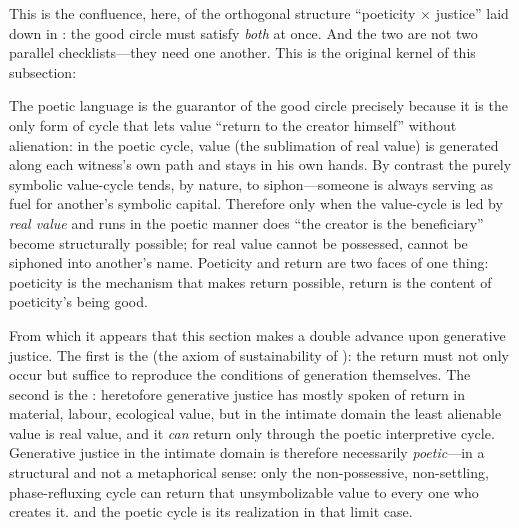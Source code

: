 This is the confluence, here, of the orthogonal structure ``poeticity $\times$ justice'' laid down in : the good circle must satisfy \emph{both} at once. And the two are not two parallel checklists---they need one another. This is the original kernel of this subsection:

\begin{claim}
The poetic language is the guarantor of the good circle precisely because it is the only form of cycle that lets value ``return to the creator himself'' without alienation: in the poetic cycle, value (the sublimation of real value) is generated along each witness's own path and stays in his own hands. By contrast the purely symbolic value-cycle tends, by nature, to siphon---someone is always serving as fuel for another's symbolic capital. Therefore only when the value-cycle is led by \emph{real value} and runs in the poetic manner does ``the creator is the beneficiary'' become structurally possible; for real value cannot be possessed, cannot be siphoned into another's name. Poeticity and return are two faces of one thing: poeticity is the mechanism that makes return possible, return is the content of poeticity's being good.
\end{claim}

From which it appears that this section makes a double advance upon generative justice. The first is the  (the axiom of sustainability of ): the return must not only occur but suffice to reproduce the conditions of generation themselves. The second is the : heretofore generative justice has mostly spoken of return in material, labour, ecological value, but in the intimate domain the least alienable value is real value, and it \emph{can} return only through the poetic interpretive cycle. Generative justice in the intimate domain is therefore necessarily \emph{poetic}---in a structural and not a metaphorical sense: only the non-possessive, non-settling, phase-refluxing cycle can return that unsymbolizable value to every one who creates it.  and the poetic cycle is its realization in that limit case.

